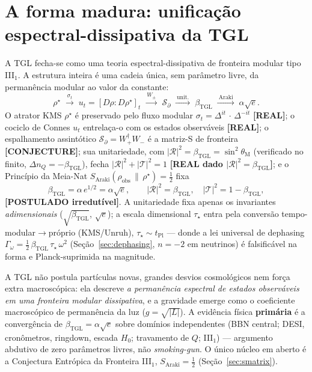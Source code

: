 \documentclass[12pt,a4paper]{article}
\newcommand{\betatgl}{\beta_{\text{TGL}}}
\newcommand{\thetaM}{\theta_{\text{M}}}
\newcommand{\rhostar}{\rho^{\star}}
\newcommand{\TGL}{\textsc{TGL}}
\begin{document}
\section{A forma madura: unificação espectral-dissipativa da \TGL}
\label{sec:unificacao}
A \TGL{} fecha-se como uma teoria espectral-dissipativa de fronteira modular tipo III$_1$.  A estrutura inteira é uma cadeia única, sem parâmetro livre, da permanência modular ao valor da constante:
\begin{equation}
\rhostar \;\xrightarrow{\ \sigma_t\ }\; u_t=[D\rho:D\rhostar]_t \;\xrightarrow{\ W_\pm\ }\; \mathcal S_\partial \;\xrightarrow{\ \text{unit.}\ }\; \betatgl \;\xrightarrow{\ \text{Araki}\ }\; \alpha\sqrt e.
\end{equation}
O atrator KMS $\rhostar$ é preservado pelo fluxo modular $\sigma_t=\Delta^{it}\,\cdot\,\Delta^{-it}$ \textbf{[REAL]}; o cociclo de Connes $u_t$ entrelaça-o com os estados observáveis \textbf{[REAL]}; o espalhamento assintótico $\mathcal S_\partial=W_+^\dagger W_-$ é a matriz-S de fronteira \textbf{[CONJECTURE]}; sua unitariedade, com $|\mathcal R|^2=\betatgl=\sin^2\thetaM$ (verificado no finito, $\Delta n_Q=-\betatgl$), fecha $|\mathcal R|^2+|\mathcal T|^2=1$ \textbf{[REAL dado $|\mathcal R|^2=\betatgl$]}; e o Princípio da Meia-Nat $S_{\mathrm{Araki}}(\rho_{\mathrm{obs}}\,\|\,\rhostar)=\tfrac12$ fixa
\begin{equation}
\betatgl=\alpha\,e^{1/2}=\alpha\sqrt e,\qquad |\mathcal R|^2=\betatgl,\quad |\mathcal T|^2=1-\betatgl,
\end{equation}
\textbf{[POSTULADO irredutível]}.  A unitariedade fixa apenas os invariantes \emph{adimensionais} ($\sqrt{\betatgl}$, $\sqrt e$); a escala dimensional $\tau_\star$ entra pela conversão tempo-modular$\to$próprio (KMS/Unruh), $\tau_\star\sim t_{\mathrm{Pl}}$ --- donde a lei universal de dephasing $\Gamma_\omega=\tfrac12\,\betatgl\,\tau_\star\,\omega^2$ (Seção~\ref{sec:dephasing}, $n=-2$ em neutrinos) é falsificável na forma e Planck-suprimida na magnitude.

A \TGL{} não postula partículas novas, grandes desvios cosmológicos nem força extra macroscópica: ela descreve \emph{a permanência espectral de estados observáveis em uma fronteira modular dissipativa}, e a gravidade emerge como o coeficiente macroscópico de permanência da luz ($g=\sqrt{|L|}$).  A evidência física \textbf{primária} é a convergência de $\betatgl=\alpha\sqrt e$ sobre domínios independentes (BBN central; DESI, cronômetros, ringdown, escada $H_0$; travamento de $Q$; III$_1$) --- argumento abdutivo de zero parâmetros livres, não \emph{smoking-gun}.  O único núcleo em aberto é a Conjectura Entrópica da Fronteira III$_1$, $S_{\mathrm{Araki}}=\tfrac12$ (Seção~\ref{sec:smatrix}).
\end{document}
